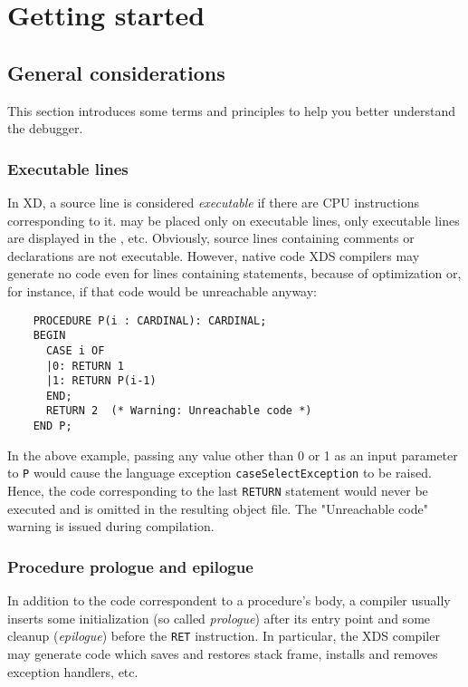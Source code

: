 \chapter{Getting started}
\label{start}

\section{General considerations}
\label{start:general}

This section introduces some terms and principles to help you better
understand the debugger.

\subsection{Executable lines}
\label{start:general:executable}

In XD, a source line is considered {\it executable} if there are CPU
instructions corresponding to it.  may
be placed only on executable lines, only executable lines are displayed
in the , etc.
Obviously, source lines containing comments or declarations are not executable.
However, native code XDS compilers may generate no code even for lines
containing statements, because of optimization or, for instance,
if that code would be unreachable anyway:
\begin{verbatim}
    PROCEDURE P(i : CARDINAL): CARDINAL;
    BEGIN
      CASE i OF
      |0: RETURN 1
      |1: RETURN P(i-1)
      END;
      RETURN 2  (* Warning: Unreachable code *)
    END P;
\end{verbatim}
In the above example, passing any value other than 0 or 1
as an input parameter to \verb'P' would cause the language exception
\verb'caseSelectException' to be raised. Hence, the code
corresponding to the last \verb'RETURN' statement would never
be executed and is omitted in the resulting object file.
The "Unreachable code" warning is issued during compilation.

\subsection{Procedure prologue and epilogue}
\label{start:general:epilogue}

In addition to the code correspondent to a procedure's body, a compiler
usually inserts some initialization (so called {\em prologue})
after its entry point and some cleanup ({\em epilogue})
before the \verb'RET' instruction. In particular,
the XDS compiler may generate code which
saves and restores stack frame, installs and removes exception handlers, etc.


